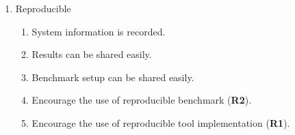 \begin{enumerate}[noitemsep]
    \item Reproducible
    \begin{enumerate}[noitemsep]
        \item System information is recorded.
        \item Results can be shared easily.
        \item Benchmark setup can be shared easily.
        \item Encourage the use of reproducible benchmark (\textbf{R2}).
        \item Encourage the use of reproducible tool implementation (\textbf{R1}).
    \end{enumerate}
\end{enumerate}




